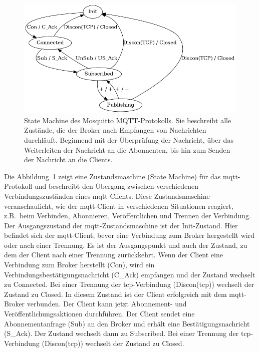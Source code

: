\begin{figure}[H]
    \centering
    \includegraphics[width=\textwidth]{img/state_machine}
    \caption[State Machine des MQTT-Protokolls]{State Machine des Mosquitto MQTT-Protokolls. Sie beschreibt alle Zustände, die der Broker nach Empfangen von
    Nachrichten durchläuft. Beginnend mit der Überprüfung der Nachricht, über das Weiterleiten der Nachricht an die Abonnenten,
    bis hin zum Senden der Nachricht an die Clients.}
    \label{fig:mqtt_state_machine}
\end{figure}
\noindent Die Abbildung~\ref{fig:mqtt_state_machine} zeigt eine Zustandsmaschine (State Machine) für das \gls{mqtt}-Protokoll und beschreibt den Übergang zwischen
verschiedenen Verbindungszuständen eines \gls{mqtt}-Clients.
Diese Zustandsmaschine veranschaulicht, wie der \gls{mqtt}-Client in verschiedenen Situationen reagiert, z.B.\ beim Verbinden,
Abonnieren, Veröffentlichen und Trennen der Verbindung.\newline
Der Ausgangszustand der \gls{mqtt}-Zustandsmaschine ist der Init-Zustand.
Hier befindet sich der \gls{mqtt}-Client, bevor eine Verbindung zum Broker hergestellt wird oder nach einer Trennung.
Es ist der Ausgangspunkt und auch der Zustand, zu dem der Client nach einer Trennung zurückkehrt.
Wenn der Client eine Verbindung zum Broker herstellt (Con), wird ein Verbindungsbestätigungsnachricht (C\_Ack) empfangen
und der Zustand wechselt zu Connected.
Bei einer Trennung der \gls{tcp}-Verbindung (Discon(\gls{tcp})) wechselt der Zustand zu Closed.
In diesem Zustand ist der Client erfolgreich mit dem \gls{mqtt}-Broker verbunden.\newline
Der Client kann jetzt Abonnement- und Veröffentlichungsaktionen durchführen.
Der Client sendet eine Abonnementanfrage (Sub) an den Broker und erhält eine Bestätigungsnachricht (S\_Ack).
Der Zustand wechselt dann zu Subscribed.
Bei einer Trennung der \gls{tcp}-Verbindung (Discon(\gls{tcp})) wechselt der Zustand zu Closed.
